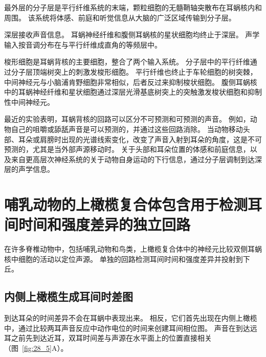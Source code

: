 最外层的分子层是平行纤维系统的末端，颗粒细胞的无髓鞘轴突散布在耳蜗核内和周围。
该系统将体感、前庭和听觉信息从大脑的广泛区域传输到分子层。


深层接收声音信息。
耳蜗神经纤维和腹侧耳蜗核的星状细胞均终止于深层。
声学输入按音调分布在与平行纤维成直角的等频层中。


梭形细胞是耳蜗背核的主要细胞，整合了两个输入系统。
分子层中的平行纤维通过分子层顶端树突上的刺激发梭形细胞。
平行纤维也终止于车轮细胞的树突棘，中间神经元与小脑浦肯野细胞非常相似，后者反过来抑制梭状细胞。
腹侧耳蜗核中的耳蜗神经纤维和星状细胞通过深层光滑基底树突上的突触激发梭状细胞和抑制性中间神经元。


最近的实验表明，耳蜗背核的回路可以区分不可预测和可预测的声音。
例如，动物自己的咀嚼或舔舐声音是可以预测的，并通过这些回路消除。
当动物移动头部、耳朵或肩膀时出现的光谱线索变化，改变了声音入射到耳朵的角度，这是不可预测的，尤其是当外部声源移动时。
关于头部和耳朵位置的体感和前庭信息，以及来自更高层次神经系统的关于动物自身运动的下行信息，通过分子层调制到达深层的声学信息。



\section{哺乳动物的上橄榄复合体包含用于检测耳间时间和强度差异的独立回路}

在许多脊椎动物中，包括哺乳动物和鸟类，上橄榄复合体中的神经元比较双侧耳蜗核中细胞的活动以定位声源。
单独的回路检测耳间时间和强度差异并投射到下丘。



\subsection{内侧上橄榄生成耳间时差图}

到达耳朵的时间差异不会在耳蜗中表现出来。
相反，它们首先出现在内侧上橄榄中，通过比较两耳声音反应中动作电位的时间来创建耳间相位图。
声音在到达远耳之前先到达近耳，双耳时间差与声源在水平面上的位置直接相关（图~\ref{fig:28_5}A）。


